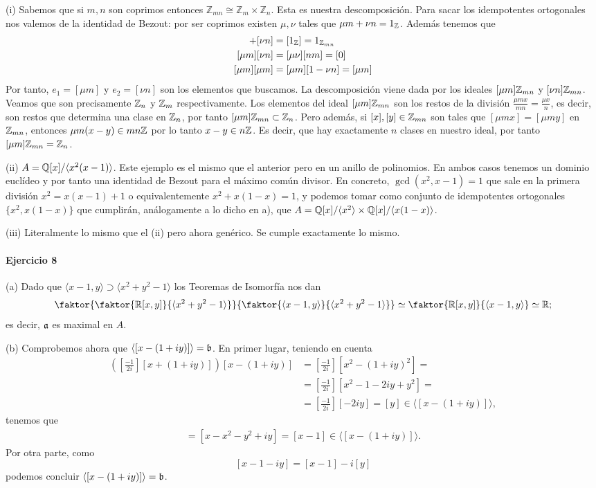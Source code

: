 \documentclass[../main.tex]{subfiles}
\begin{document}
(i) Sabemos que si $m,n$ son coprimos entonces $\mathbb Z_{mn} \cong \mathbb Z_m \times \mathbb Z_n$. Esta es nuestra descomposición. Para sacar los idempotentes ortogonales nos valemos de la identidad de Bezout: por ser coprimos existen $\mu, \nu $ tales que $\mu m+ \nu n = 1_{\mathbb{Z}}$. Además tenemos que
\begin{align}
[\mu m] +[\nu n] &= [1_\Z] = 1_{\Z_{mn}}\\
[\mu m] [\nu n] &= [\mu \nu] [nm] = [0]\\
[\mu m] [\mu m] &= [\mu m][1-\nu n] = [\mu m]
\end{align}
Por tanto, $e_1 = [\mu m]$ y $e_2 = [\nu n]$ son los elementos que buscamos. La descomposición viene dada por los ideales $[\mu m]\mathbb{Z}_{mn}$ y $[\nu n]\mathbb{Z}_{mn}$. Veamos que son precisamente $\mathbb{Z}_n$ y $\mathbb{Z}_m$ respectivamente. Los elementos del ideal $[\mu m]\mathbb{Z}_{mn}$ son los restos de la división $\frac{\mu m x}{mn} = \frac{\mu x}{n}$, es decir, son restos que determina una clase en $\mathbb{Z}_n$, por tanto $[\mu m]\mathbb{Z}_{mn} \subset \mathbb{Z}_n$. Pero además, si $[x],[y]\in \mathbb{Z}_{mn}$ son tales que $[\mu mx] = [\mu m y]$ en $\mathbb{Z}_{mn}$, entonces $\mu m(x-y)\in mn\mathbb{Z}$ por lo tanto $x-y \in n\mathbb{Z}$. Es decir, que hay exactamente $n$ clases en nuestro ideal, por tanto $[\mu m]\mathbb{Z}_{mn} = \mathbb{Z}_n$.

(ii) $A=\mathbb{Q}[x] / \langle x^2(x-1)\rangle$. Este ejemplo es el mismo que el anterior pero en un anillo de polinomios. En ambos casos tenemos un dominio euclídeo y por tanto una identidad de Bezout para el máximo común divisor. En concreto, $\gcd(x^2,x-1) = 1$ que sale en la primera división $x^2 = x(x-1)+1$ o equivalentemente $x^2+x(1-x) = 1$, y podemos tomar como conjunto de idempotentes ortogonales $\{x^2, x(1-x)\}$ que cumplirán, análogamente a lo dicho en a), que $A = \mathbb{Q}[x]/\langle x^2\rangle \times \mathbb{Q}[x]/\langle x(1-x)\rangle$.

(iii) Literalmente lo mismo que el (ii) pero ahora genérico. Se cumple exactamente lo mismo.

\paragraph{Ejercicio 8}
(a) Dado que $\langle x-1,y\rangle\supset\langle x^2+y^2-1\rangle$ los Teoremas de Isomorfía nos dan
$$\faktor{\faktor{\R[x,y]}{\langle x^2+y^2-1\rangle}}{\faktor{\langle x-1,y\rangle}{\langle x^2+y^2-1\rangle}}\simeq\faktor{\R[x,y]}{\langle x-1,y\rangle}\simeq\R;$$
es decir, $\mathfrak{a}$ es maximal en $A$.

(b) Comprobemos ahora que $\langle[x-(1+iy)]\rangle=\mathfrak{b}$. En primer lugar, teniendo en cuenta
\begin{align*}
\left(\left[\frac{-1}{2i}\right][x+(1+iy)]\right)[x-(1+iy)]&=\left[\frac{-1}{2i}\right][x^2-(1+iy)^2]=\\
&=\left[\frac{-1}{2i}\right][x^2-1-2iy+y^2]=\\
&=\left[\frac{-1}{2i}\right][-2iy]=[y]\in\langle [x-(1+iy)]\rangle,
\end{align*}
tenemos que
\begin{align*}
[-x-iy][x-1-iy]=[x-x^2-y^2+iy]=[x-1]\in\langle [x-(1+iy)]\rangle.
\end{align*}
Por otra parte, como
$$[x-1-iy]=[x-1]-i[y]$$
podemos concluir $\langle[x-(1+iy)]\rangle=\mathfrak{b}$.
\end{document}
